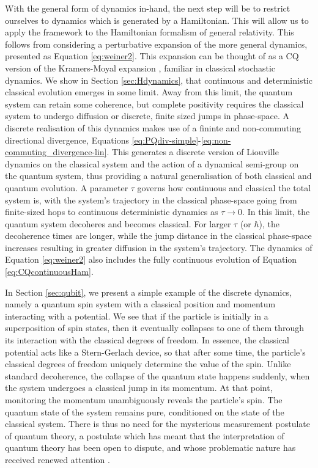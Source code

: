 \documentclass[aps,pra,showpacs,citeautoscript,amsmath,amssymb,floatfix,superscriptaddress,bbm, verbatim,amsfonts,changes,11pt,nofootinbib,longbibliography]{revtex4-2}
\begin{document}
With the general form of dynamics in-hand, the next step will be to restrict ourselves to dynamics which is generated by a Hamiltonian. This will allow us to apply the framework to the Hamiltonian formalism of general relativity. %
This follows from considering a perturbative expansion of the more general dynamics, presented as Equation \eqref{eq:weiner2}.  This expansion can be thought of as a CQ version of the Kramers-Moyal expansion \cite{kramers1940brownian,moyal1949stochastic}, familiar in classical stochastic dynamics.
We show in Section \ref{sec:Hdynamics}, that continuous and deterministic classical evolution emerges in some limit. 
Away from this limit, the quantum system can retain some coherence, but complete positivity requires the classical system to undergo diffusion or discrete, finite sized jumps in phase-space. 
A discrete realisation of this dynamics makes use of a fininte and non-commuting directional divergence, Equations \eqref{eq:PQdiv-simple}-\eqref{eq:non-commuting_divergence-lin}. This generates 
a discrete version of Liouville dynamics on the classical system and the action of a dynamical semi-group on the quantum system, thus providing a natural generalisation of both classical and quantum evolution. 
A parameter $\tau$ governs how continuous and classical the total system is, with the system's trajectory in the classical phase-space going from finite-sized hops to continuous deterministic dynamics as $\tau\rightarrow 0$. In this limit, the quantum system decoheres and becomes classical. For larger $\tau$ (or $\hbar$), the decoherence times are longer, while the jump distance in the classical phase-space increases resulting in greater diffusion in the system's trajectory. The dynamics of Equation \eqref{eq:weiner2} also includes the fully continuous evolution of Equation \eqref{eq:CQcontinuousHam}.

In Section \ref{sec:qubit}, we present a simple example of the discrete dynamics, namely a quantum spin system with a classical position and momentum interacting with a potential. We see that if the particle is initially in a superposition of spin states, then it eventually collapses to one of them through its interaction with the classical degrees of freedom. In essence, the classical potential acts like  a Stern-Gerlach device, so that after some time, the particle's classical degrees of freedom uniquely determine the value of the spin. Unlike standard decoherence, the collapse of the quantum state happens suddenly, when the system undergoes a classical jump in its momentum. At that point, monitoring the momentum unambiguously reveals the particle's spin. The quantum state of the system remains pure, conditioned on the state of the classical system. There is thus no need for the mysterious measurement postulate of quantum theory, a postulate which has meant that the interpretation of quantum theory has been open to dispute, and whose problematic nature has  received renewed attention \cite{frauchiger2016single}.
\end{document}
